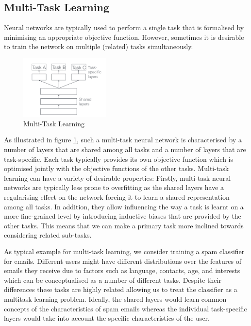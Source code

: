 \subsection{Multi-Task Learning}
Neural networks are typically used to perform a single task that is formalised by minimising an appropriate objective function. However, sometimes it is desirable to train the network on multiple (related) tasks simultaneously. 
\begin{figure}
	\caption{Multi-Task Learning}\label{fig:multitask-learning}   
	\centering
	\includegraphics[width=0.4\textwidth]{figures/chapter-2/multitask-learning.png}
\end{figure}
As illustrated in figure \ref{fig:multitask-learning}, such a multi-task neural network is characterised by a number of layers that are shared among all tasks and a number of layers that are task-specific. Each task typically provides its own objective function which is optimised jointly with the objective functions of the other tasks. 
Multi-task learning can have a variety of desirable properties: Firstly, multi-task neural networks are typically less prone to overfitting as the shared layers have a regularising effect on the network forcing it to learn a shared representation among all tasks. In addition, they allow influencing the way a task is learnt on a more fine-grained level by introducing inductive biases that are provided by the other tasks. This means that we can make a primary task more inclined towards considering related sub-tasks. 

As typical example for multi-task learning, we consider training a spam classifier for emails. Different users might have different distributions over the features of emails they receive due to factors such as language, contacts, age, and interests which can be conceptualised as a number of different tasks. Despite their differences these tasks are highly related allowing us to treat the classifier as a multitask-learning problem. Ideally, the shared layers would learn common concepts of the characteristics of spam emails whereas the individual task-specific layers would take into account the specific characteristics of the user. 

